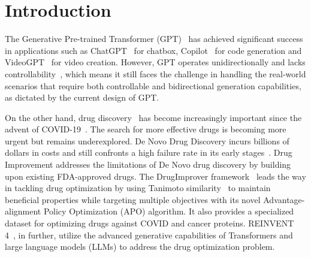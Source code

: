 \section{Introduction}\label{sec:intro}


The Generative Pre-trained Transformer (GPT)~\citep{floridi2020gpt,yenduri2023generative} has achieved significant success in applications such as ChatGPT~\citep{ouyang2022training,wu2023brief} for chatbox, Copilot~\citep{barke2023grounded} for code generation and VideoGPT~\citep{yan2021videogpt} for video creation. However, GPT operates unidirectionally and lacks controllability~\citep{ethayarajh2019contextual}, which means it still faces the challenge in handling the real-world scenarios that require both controllable and bidirectional generation capabilities, as dictated by the current design of GPT. 


On the other hand, drug discovery~\citep{berdigaliyev2020overview} has become increasingly important since the advent of COVID-19~\citep{muratov2021critical}. The search for more effective drugs is becoming more urgent but remains underexplored. De Novo Drug Discovery incurs billions of dollars in costs and still confronts a high failure rate in its early stages~\citep{tong2021generative}. Drug Improvement addresses the limitations of De Novo drug discovery by building upon existing FDA-approved drugs. 
The DrugImprover framework~\citep{liu2023drugimprover} leads the way in tackling drug optimization by using Tanimoto similarity~\citep{landrum2013rdkit} to maintain beneficial properties while targeting multiple objectives with its novel Advantage-alignment Policy Optimization (APO) algorithm. It also provides a specialized dataset for optimizing drugs against COVID and cancer proteins.
REINVENT 4~\citep{he2021molecular, he2022transformer, loeffler2024reinvent}, in further, utilize the advanced generative capabilities of Transformers and large language models (LLMs) to address the drug optimization problem. 


